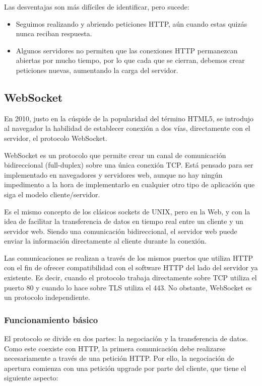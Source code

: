 Las desventajas son más difíciles de identificar, pero sucede:

\begin{itemize}
  \item Seguimos realizando y abriendo peticiones HTTP, aún cuando estas quizás nunca reciban respuesta.
  \item Algunos servidores no permiten que las conexiones HTTP permanezcan abiertas por mucho tiempo, por lo que cada que se cierran, debemos crear peticiones nuevas, aumentando la carga del servidor.
\end{itemize}

\subsection{WebSocket}

En 2010, justo en la cúspide de la popularidad del término HTML5, se introdujo al navegador la habilidad de establecer conexión a dos vías, directamente con el servidor, el protocolo WebSocket.

WebSocket es un protocolo que permite crear un canal de comunicación bidireccional (full-duplex) sobre una única conexión TCP. Está pensado para ser implementado en navegadores y servidores web, aunque no hay ningún impedimento a la hora de implementarlo en cualquier otro tipo de aplicación que siga el modelo cliente/servidor.

Es el mismo concepto de los clásicos sockets de UNIX, pero en la Web, y con la idea de facilitar la transferencia de datos en tiempo real entre un cliente y un servidor web. Siendo una comunicación bidireccional, el servidor web puede enviar la información directamente al cliente durante la conexión.

Las comunicaciones se realizan a través de los mismos puertos que utiliza HTTP con el fin de ofrecer compatibilidad con el software HTTP del lado del servidor ya existente. Es decir, cuando el protocolo trabaja directamente sobre TCP utiliza el puerto 80 y cuando lo hace sobre TLS utiliza el 443. No obstante, WebSocket es un protocolo independiente.

\subsubsection{Funcionamiento básico}

El protocolo se divide en dos partes: la negociación y la transferencia de datos. Como este coexiste con HTTP, la primera comunicación debe realizarse necesariamente a través de una petición HTTP. Por ello, la negociación de apertura comienza con una petición upgrade por parte del cliente, que tiene el siguiente aspecto:

